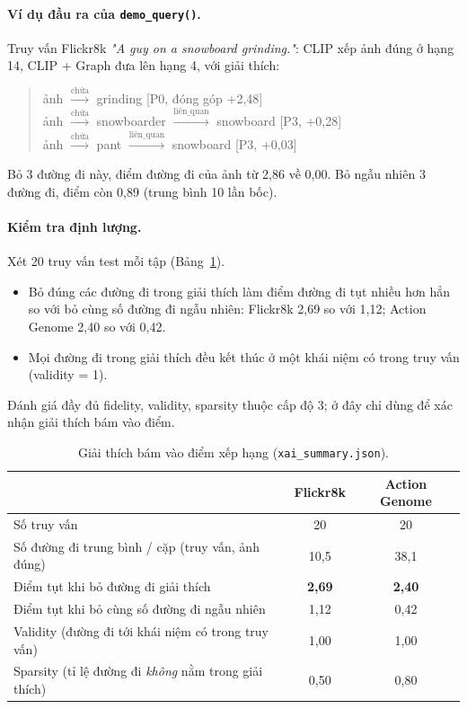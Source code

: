 \documentclass[11pt,a4paper]{article}
\begin{document}
\paragraph{Ví dụ đầu ra của \texttt{demo\_query()}.} Truy vấn Flickr8k \textit{"A guy on a snowboard grinding."}: CLIP xếp ảnh đúng ở hạng 14, CLIP + Graph đưa lên hạng 4, với giải thích:
\begin{quote}\small
ảnh \(\xrightarrow{\text{chứa}}\) grinding \hfill [P0, đóng góp +2,48]\\
ảnh \(\xrightarrow{\text{chứa}}\) snowboarder \(\xrightarrow{\text{liên\_quan}}\) snowboard \hfill [P3, +0,28]\\
ảnh \(\xrightarrow{\text{chứa}}\) pant \(\xrightarrow{\text{liên\_quan}}\) snowboard \hfill [P3, +0,03]
\end{quote}
Bỏ 3 đường đi này, điểm đường đi của ảnh từ 2,86 về 0,00. Bỏ ngẫu nhiên 3 đường đi, điểm còn 0,89 (trung bình 10 lần bốc).

\paragraph{Kiểm tra định lượng.} Xét 20 truy vấn test mỗi tập (Bảng~\ref{tab:fid}).
\begin{itemize}
  \item Bỏ đúng các đường đi trong giải thích làm điểm đường đi tụt nhiều hơn hẳn so với bỏ cùng số đường đi ngẫu nhiên: Flickr8k 2,69 so với 1,12; Action Genome 2,40 so với 0,42.
  \item Mọi đường đi trong giải thích đều kết thúc ở một khái niệm có trong truy vấn (validity = 1).
\end{itemize}
Đánh giá đầy đủ fidelity, validity, sparsity thuộc cấp độ 3; ở đây chỉ dùng để xác nhận giải thích bám vào điểm.

\begin{table}[H]
\centering\small
\begin{tabular}{lcc}
\toprule
 & \textbf{Flickr8k} & \textbf{Action Genome} \\
\midrule
Số truy vấn & 20 & 20 \\
Số đường đi trung bình / cặp (truy vấn, ảnh đúng) & 10,5 & 38,1 \\
Điểm tụt khi bỏ đường đi giải thích & \textbf{2,69} & \textbf{2,40} \\
Điểm tụt khi bỏ cùng số đường đi ngẫu nhiên & 1,12 & 0,42 \\
Validity (đường đi tới khái niệm có trong truy vấn) & 1,00 & 1,00 \\
Sparsity (tỉ lệ đường đi \emph{không} nằm trong giải thích) & 0,50 & 0,80 \\
\bottomrule
\end{tabular}
\caption{Giải thích bám vào điểm xếp hạng (\texttt{xai\_summary.json}).}
\label{tab:fid}
\end{table}
\end{document}

